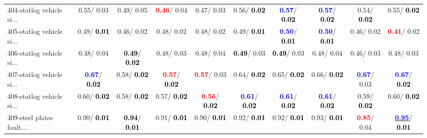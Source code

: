 \begin{table}[h]
\begin{center}
{\begin{tabular}{lc|c|c|c|c|c|c|c|c}
404-statlog vehicle si... &   0.55/  0.03 &   0.49/  0.05 & \textcolor{red}{\textbf{  0.46}}/  0.04 &   0.47/  0.03 &   0.56/\textcolor{black}{\textbf{  0.02}} & \textcolor{blue}{\textbf{  0.57}}/\textcolor{black}{\textbf{  0.02}} & \textcolor{blue}{\textbf{  0.57}}/\textcolor{black}{\textbf{  0.02}} &   0.54/\textcolor{black}{\textbf{  0.02}} &   0.55/\textcolor{black}{\textbf{  0.02}} \\
405-statlog vehicle si... &   0.49/\textcolor{black}{\textbf{  0.01}} &   0.46/  0.02 &   0.48/  0.02 &   0.48/  0.02 &   0.49/\textcolor{black}{\textbf{  0.01}} & \textcolor{blue}{\textbf{  0.50}}/\textcolor{black}{\textbf{  0.01}} & \textcolor{blue}{\textbf{  0.50}}/\textcolor{black}{\textbf{  0.01}} &   0.46/  0.02 & \textcolor{red}{\textbf{  0.41}}/  0.02 \\ \hline
406-statlog vehicle si... &   0.48/  0.04 & \textcolor{black}{\textbf{  0.49}}/\textcolor{black}{\textbf{  0.02}} &   0.48/  0.03 &   0.48/  0.04 & \textcolor{black}{\textbf{  0.49}}/  0.03 & \textcolor{black}{\textbf{  0.49}}/  0.03 &   0.48/  0.04 &   0.46/  0.03 &   0.48/  0.03 \\
407-statlog vehicle si... & \textcolor{blue}{\textbf{  0.67}}/\textcolor{black}{\textbf{  0.02}} &   0.58/\textcolor{black}{\textbf{  0.02}} & \textcolor{red}{\textbf{  0.57}}/\textcolor{black}{\textbf{  0.02}} & \textcolor{red}{\textbf{  0.57}}/  0.03 &   0.64/\textcolor{black}{\textbf{  0.02}} &   0.65/\textcolor{black}{\textbf{  0.02}} &   0.66/\textcolor{black}{\textbf{  0.02}} & \textcolor{blue}{\textbf{  0.67}}/  0.03 & \textcolor{blue}{\textbf{  0.67}}/\textcolor{black}{\textbf{  0.02}} \\
408-statlog vehicle si... &   0.60/\textcolor{black}{\textbf{  0.02}} &   0.58/\textcolor{black}{\textbf{  0.02}} &   0.57/\textcolor{black}{\textbf{  0.02}} & \textcolor{red}{\textbf{  0.56}}/\textcolor{black}{\textbf{  0.02}} & \textcolor{blue}{\textbf{  0.61}}/\textcolor{black}{\textbf{  0.02}} & \textcolor{blue}{\textbf{  0.61}}/\textcolor{black}{\textbf{  0.02}} & \textcolor{blue}{\textbf{  0.61}}/\textcolor{black}{\textbf{  0.02}} &   0.59/\textcolor{black}{\textbf{  0.02}} &   0.60/\textcolor{black}{\textbf{  0.02}} \\
409-steel plates fault... &   0.90/\textcolor{black}{\textbf{  0.01}} & \textcolor{black}{\textbf{  0.94}}/\textcolor{black}{\textbf{  0.01}} &   0.91/\textcolor{black}{\textbf{  0.01}} &   0.90/\textcolor{black}{\textbf{  0.01}} &   0.92/\textcolor{black}{\textbf{  0.01}} &   0.92/\textcolor{black}{\textbf{  0.01}} &   0.93/\textcolor{black}{\textbf{  0.01}} & \textcolor{red}{\textbf{  0.85}}/  0.04 & \underline{\textcolor{blue}{\textbf{  0.95}}}/\textcolor{black}{\textbf{  0.01}} \\

\end{tabular}}
\end{center}
\end{table}
